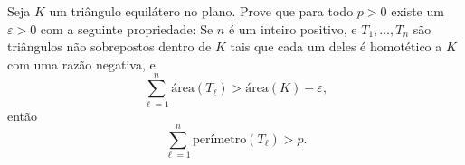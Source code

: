 Seja \(K\) um triângulo equilátero no plano.
Prove que para todo \(p>0\) existe um \(\varepsilon>0\) com a seguinte propriedade:
Se \(n\) é um inteiro positivo, e \(T_1,\ldots,T_n\) são triângulos não sobrepostos dentro de \(K\) tais que cada um deles é homotético a \(K\) com uma razão negativa, e 
\[ \sum_{\ell=1}^n \textrm{área}(T_\ell) > \textrm{área}(K)-\varepsilon, \]
então
\[ \sum_{\ell=1}^n \textrm{perímetro}(T_\ell) > p.  \]
